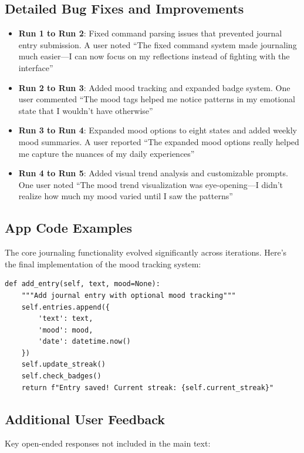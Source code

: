 \documentclass{article} %
\begin{document}
\subsection{Detailed Bug Fixes and Improvements}
\begin{itemize}
    \item \textbf{Run 1 to Run 2}: Fixed command parsing issues that prevented journal entry submission. A user noted ``The fixed command system made journaling much easier---I can now focus on my reflections instead of fighting with the interface''
    
    \item \textbf{Run 2 to Run 3}: Added mood tracking and expanded badge system. One user commented ``The mood tags helped me notice patterns in my emotional state that I wouldn't have otherwise''
    
    \item \textbf{Run 3 to Run 4}: Expanded mood options to eight states and added weekly mood summaries. A user reported ``The expanded mood options really helped me capture the nuances of my daily experiences''
    
    \item \textbf{Run 4 to Run 5}: Added visual trend analysis and customizable prompts. One user noted ``The mood trend visualization was eye-opening---I didn't realize how much my mood varied until I saw the patterns''
\end{itemize}

\subsection{App Code Examples}
The core journaling functionality evolved significantly across iterations. Here's the final implementation of the mood tracking system:

\begin{verbatim}
def add_entry(self, text, mood=None):
    """Add journal entry with optional mood tracking"""
    self.entries.append({
        'text': text,
        'mood': mood,
        'date': datetime.now()
    })
    self.update_streak()
    self.check_badges()
    return f"Entry saved! Current streak: {self.current_streak}"
\end{verbatim}

\subsection{Additional User Feedback}
Key open-ended responses not included in the main text:
\end{document}
